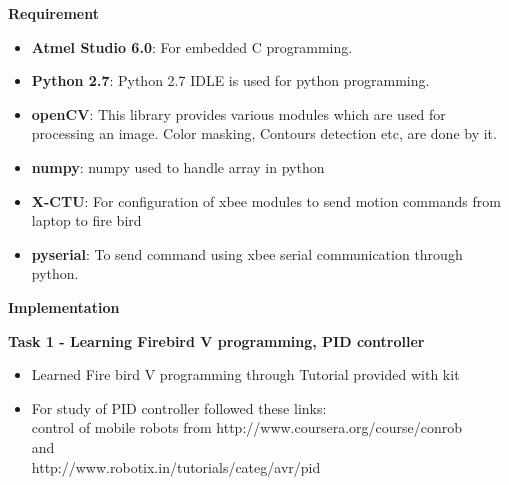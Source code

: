 \documentclass[report]{res}
\begin{document}
	
	
	\begin{center}
		{\huge\textbf{Requirement}\par}
	\end{center}

	\begin{itemize}
		\item \textbf{Atmel Studio 6.0}: For embedded C programming. 
		\item \textbf{Python 2.7}: Python 2.7 IDLE is used for python programming. 
		\item \textbf{openCV}: This library provides various modules which are used for processing an image. Color 	masking, Contours detection etc, are done by it.
		\item \textbf{numpy}: numpy used to handle array in python
		\item \textbf{X-CTU}: For configuration of xbee modules to send motion commands from laptop to fire bird
		\item \textbf{pyserial}: To send command using xbee serial communication through python.
	\end{itemize}
		
	\pagebreak	
	
		
	\begin{center}
		{\huge\textbf{Implementation}\par}
	\end{center}
	
	{\Large \textbf{Task 1 - Learning Firebird V programming, PID controller}\par} 
	\begin{itemize}
		\item Learned Fire bird V programming through Tutorial provided with kit \item For study of PID controller followed these links: \\
		 control of mobile robots from 
		 http://www.coursera.org/course/conrob\\
		 and\\
		 http://www.robotix.in/tutorials/categ/avr/pid\\
	\end{itemize}
	
\end{document}

